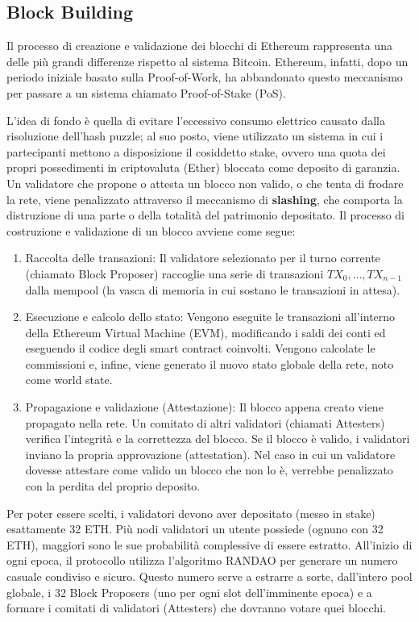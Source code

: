 \subsection{Block Building}
Il processo di creazione e validazione dei blocchi di Ethereum rappresenta una delle più grandi differenze rispetto al sistema Bitcoin. Ethereum, infatti, dopo un periodo iniziale basato sulla Proof-of-Work, ha abbandonato questo meccanismo per passare a un sistema chiamato Proof-of-Stake (PoS).

L'idea di fondo è quella di evitare l'eccessivo consumo elettrico causato dalla risoluzione dell'hash puzzle; al suo posto, viene utilizzato un sistema in cui i partecipanti mettono a disposizione il cosiddetto stake, ovvero una quota dei propri possedimenti in criptovaluta (Ether) bloccata come deposito di garanzia. Un validatore che propone o attesta un blocco non valido, o che tenta di frodare la rete, viene penalizzato attraverso il meccanismo di \textbf{slashing}, che comporta la distruzione di una parte o della totalità del patrimonio depositato. Il processo di costruzione e validazione di un blocco avviene come segue:
\begin{enumerate}
    \item Raccolta delle transazioni: Il validatore selezionato per il turno corrente (chiamato Block Proposer) raccoglie una serie di transazioni $TX_0, \dots, TX_{n-1}$ dalla mempool (la vasca di memoria in cui sostano le transazioni in attesa).
    \item Esecuzione e calcolo dello stato: Vengono eseguite le transazioni all'interno della Ethereum Virtual Machine (EVM), modificando i saldi dei conti ed eseguendo il codice degli smart contract coinvolti. Vengono calcolate le commissioni e, infine, viene generato il nuovo stato globale della rete, noto come world state.
    \item Propagazione e validazione (Attestazione): Il blocco appena creato viene propagato nella rete. Un comitato di altri validatori (chiamati Attesters) verifica l'integrità e la correttezza del blocco. Se il blocco è valido, i validatori inviano la propria approvazione (attestation). Nel caso in cui un validatore dovesse attestare come valido un blocco che non lo è, verrebbe penalizzato con la perdita del proprio deposito.
\end{enumerate}
Per poter essere scelti, i validatori devono aver depositato (messo in stake) esattamente 32 ETH. Più nodi validatori un utente possiede (ognuno con 32 ETH), maggiori sono le sue probabilità complessive di essere estratto. All'inizio di ogni epoca, il protocollo utilizza l'algoritmo RANDAO per generare un numero casuale condiviso e sicuro. Questo numero serve a estrarre a sorte, dall'intero pool globale, i 32 Block Proposers (uno per ogni slot dell'imminente epoca) e a formare i comitati di validatori (Attesters) che dovranno votare quei blocchi.

